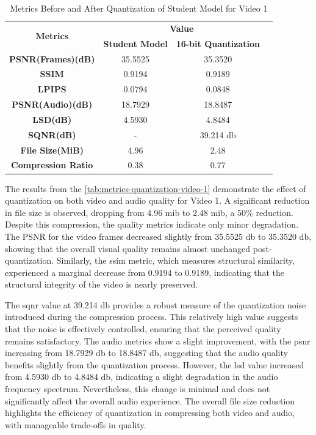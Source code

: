     \begin{table}[H]
        \centering
        \caption{Metrics Before and After Quantization of Student Model for Video 1}
        \label{tab:metrics-quantization-video-1}
        \begin{tabular}{|c|c|c|c|}
            \hline
            \multirow{2}{*}{\textbf{Metrics}} & \multicolumn{2}{c|}{\textbf{Value}} \\ \cline{2-3}
            & \textbf{Student Model} & \textbf{16-bit Quantization} \\ \hline
            \textbf{PSNR(Frames)(dB)} & 35.5525 & 35.3520 \\ \hline
            \textbf{SSIM} & 0.9194 & 0.9189 \\ \hline
            \textbf{LPIPS} & 0.0794 & 0.0848\\ \hline
            \textbf{PSNR(Audio)(dB)} & 18.7929 & 18.8487  \\ \hline
            \textbf{LSD(dB)} & 4.5930 & 4.8484 \\ \hline
            \textbf{SQNR(dB)} & - & 39.214 \gls{db} \\ \hline
            \textbf{File Size(MiB)} & 4.96 & 2.48 \\ \hline
            \textbf{Compression Ratio} & 0.38 & 0.77 \\ \hline
        \end{tabular}
    \end{table}

    The results from the \autoref{tab:metrics-quantization-video-1} demonstrate the effect of quantization on both video and audio quality for Video 1. A significant reduction in file size is observed, dropping from 4.96 \gls{mib} to 2.48 \gls{mib}, a 50\% reduction. Despite this compression, the quality metrics indicate only minor degradation. The PSNR for the video frames decreased slightly from 35.5525 \gls{db} to 35.3520 \gls{db}, showing that the overall visual quality remains almost unchanged post-quantization. Similarly, the \gls{ssim} metric, which measures structural similarity, experienced a marginal decrease from 0.9194 to 0.9189, indicating that the structural integrity of the video is nearly preserved.

    The \gls{sqnr} value at 39.214 \gls{db} provides a robust measure of the quantization noise introduced during the compression process. This relatively high value suggests that the noise is effectively controlled, ensuring that the perceived quality remains satisfactory. The audio metrics show a slight improvement, with the \gls{psnr} increasing from 18.7929 \gls{db} to 18.8487 \gls{db}, suggesting that the audio quality benefits slightly from the quantization process. However, the \gls{lsd} value increased from 4.5930 \gls{db} to 4.8484 \gls{db}, indicating a slight degradation in the audio frequency spectrum. Nevertheless, this change is minimal and does not significantly affect the overall audio experience. The overall file size reduction highlights the efficiency of quantization in compressing both video and audio, with manageable trade-offs in quality.

